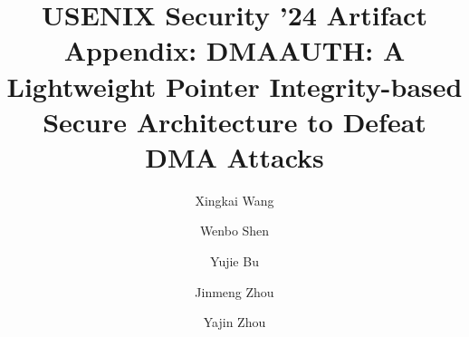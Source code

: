 %
%
%
%
\usepackage[available,functional]{usenixbadges}

\newcommand{\name}{D{\footnotesize MA}A{\footnotesize UTH}\xspace}
\newcommand\blfootnote[1]{
    \begingroup
    \renewcommand\thefootnote{}\footnote{#1}
    \addtocounter{footnote}{-1}
    \endgroup
}
\newcommand{\code}[1]{\texttt{{\small \detokenize{#1}}}}



\date{}

\title{USENIX Security '24 Artifact Appendix: D{\large\textbf MA}A{\large\textbf UTH}: A Lightweight Pointer Integrity-based Secure Architecture to Defeat DMA Attacks}

\author{Xingkai Wang}
\author{Wenbo Shen\textsuperscript{\Letter}}
\author{Yujie Bu}
\author{Jinmeng Zhou}
\author{Yajin Zhou}

\maketitle




